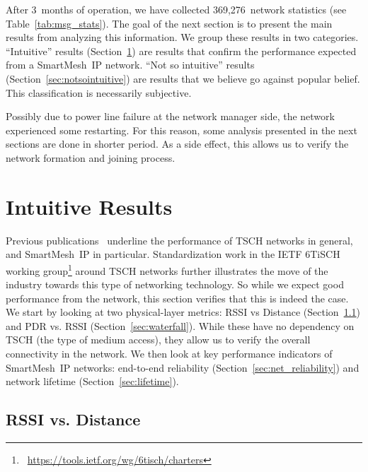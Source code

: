 \documentclass{sig-alternate}
\newcommand{\smip}                {SmartMesh~IP\xspace}
\newcommand{\NUMSTATS}            {369,276\xspace}
\begin{document}

After 3~months of operation, we have collected \NUMSTATS~network statistics (see Table~\ref{tab:msg_stats}).
The goal of the next section is to present the main results from analyzing this information.
We group these results in two categories.
``Intuitive'' results (Section~\ref{sec:intuitive}) are results that confirm the performance expected from a \smip network.
``Not so intuitive'' results (Section~\ref{sec:notsointuitive}) are results that we believe go against popular belief.
This classification is necessarily subjective.

Possibly due to power line failure at the network manager side, the network experienced some restarting.
For this reason, some analysis presented in the next sections are done in shorter period.
As a side effect, this allows us to verify the network formation and joining process.

\section{Intuitive Results}
\label{sec:intuitive}

Previous publications~\cite{watteyne16peach,watteyne10mitigating,watteyne09reliability,watteyne15industrial} underline the performance of TSCH networks in general, and \smip in particular.
Standardization work in the IETF 6TiSCH working group\footnote{~\url{https://tools.ietf.org/wg/6tisch/charters}} around TSCH networks further illustrates the move of the industry towards this type of networking technology.
So while we expect good performance from the network, this section verifies that this is indeed the case.
We start by looking at two physical-layer metrics: RSSI vs Distance (Section~\ref{sec:rssi_distance}) and PDR vs. RSSI (Section~\ref{sec:waterfall}).
While these have no dependency on TSCH (the type of medium access), they allow us to verify the overall connectivity in the network.
We then look at key performance indicators of \smip networks: end-to-end reliability (Section~\ref{sec:net_reliability}) and network lifetime (Section~\ref{sec:lifetime}).

\subsection{RSSI vs. Distance}
\label{sec:rssi_distance}
\end{document}
